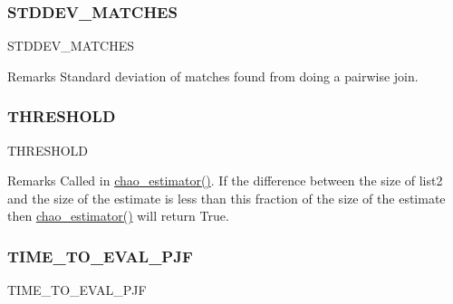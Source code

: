\subsubsection{\texorpdfstring{S\+T\+D\+D\+E\+V\+\_\+\+M\+A\+T\+C\+H\+ES}{STDDEV\_MATCHES}}
{\footnotesize\ttfamily S\+T\+D\+D\+E\+V\+\_\+\+M\+A\+T\+C\+H\+ES}

\begin{DoxyRemark}{Remarks}
Standard deviation of matches found from doing a pairwise join. 
\end{DoxyRemark}
\mbox{\label{classdynamicfilterapp_1_1models_1_1_join_a961b71469dafbf4908b0a7cd19e7f04c}} 
\subsubsection{\texorpdfstring{T\+H\+R\+E\+S\+H\+O\+LD}{THRESHOLD}}
{\footnotesize\ttfamily T\+H\+R\+E\+S\+H\+O\+LD}

\begin{DoxyRemark}{Remarks}
Called in \hyperlink{classdynamicfilterapp_1_1models_1_1_join_a582efaf16c8455e890ef61101a863966}{chao\+\_\+estimator()}. If the difference between the size of list2 and the size of the estimate is less than this fraction of the size of the estimate then \hyperlink{classdynamicfilterapp_1_1models_1_1_join_a582efaf16c8455e890ef61101a863966}{chao\+\_\+estimator()} will return True. 
\end{DoxyRemark}
\mbox{\label{classdynamicfilterapp_1_1models_1_1_join_aa0876e973360936f4052e3b837e3933f}} 
\subsubsection{\texorpdfstring{T\+I\+M\+E\+\_\+\+T\+O\+\_\+\+E\+V\+A\+L\+\_\+\+P\+JF}{TIME\_TO\_EVAL\_PJF}}
{\footnotesize\ttfamily T\+I\+M\+E\+\_\+\+T\+O\+\_\+\+E\+V\+A\+L\+\_\+\+P\+JF}

